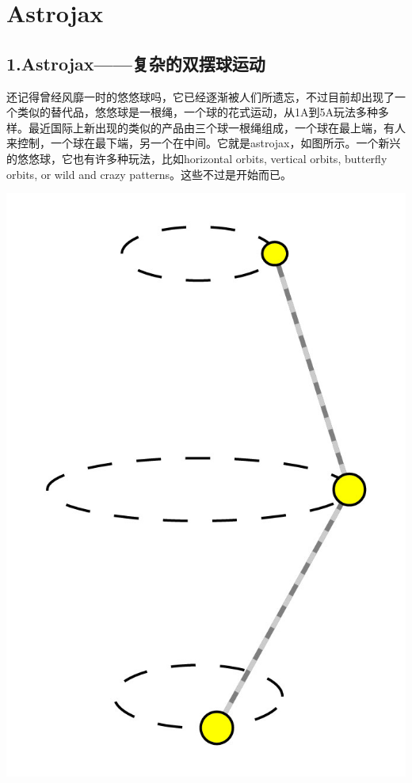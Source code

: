 \documentclass[12pt,a4paper]{ctexart}
\begin{document}
	\section{Astrojax}
	\subsection{1.Astrojax——复杂的双摆球运动}
	\begin{minipage}[b]{0.65\linewidth}
		还记得曾经风靡一时的悠悠球吗，它已经逐渐被人们所遗忘，不过目前却出现了一个类似的替代品，悠悠球是一根绳，一个球的花式运动，从1A到5A玩法多种多样。最近国际上新出现的类似的产品由三个球一根绳组成，一个球在最上端，有人来控制，一个球在最下端，另一个在中间。它就是astrojax，如图所示。一个新兴的悠悠球，它也有许多种玩法，比如horizontal orbits, vertical orbits, butterfly orbits, or wild and crazy patterns。这些不过是开始而已。
	\end{minipage}
	\hfill
	\begin{minipage}[b]{0.35\linewidth}
		\includegraphics[height=8\baselineskip]{T01.jpg}
	\end{minipage}
\end{document}
